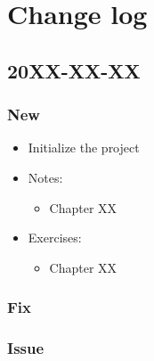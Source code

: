 \chapter{Change log}
\section*{20XX-XX-XX}
\subsection*{New}
\begin{itemize}
\item Initialize the project
\item Notes:
\begin{itemize}
\item Chapter XX
\end{itemize}
\item Exercises:
\begin{itemize}
\item Chapter XX
\end{itemize}
\end{itemize}

\subsection*{Fix}

\subsection*{Issue}